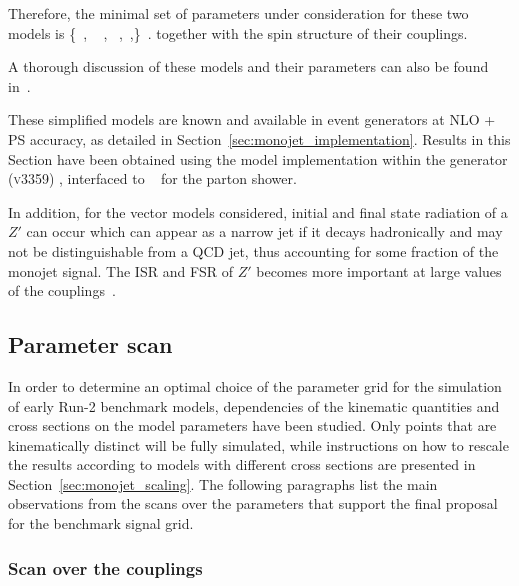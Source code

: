 Therefore, the minimal set of parameters under consideration for these two models is
\bea
\left\{~\gq, ~ \gDM, ~\mDM,~\mMed,\right\} \,.
\eea
together with the spin structure of their couplings. 

A thorough discussion of these models and their parameters can also be found in~\cite{Buchmueller:2014yoa}.
 

These simplified models are known and available in event generators at NLO + PS accuracy, as detailed in Section~\ref{sec:monojet_implementation}. 
Results in this Section have been obtained using the model implementation within the \powheg generator (\textsc{v3359}) \cite{Haisch:2013ata},  interfaced to \pythiaEight~\cite{Sjostrand:2007gs} for the parton shower.

In addition, for the vector models considered, initial and final state radiation of a $Z'$ can occur which can appear as a narrow jet if it decays hadronically and may not be distinguishable from a QCD jet, thus accounting for some fraction of the monojet signal. The ISR and FSR of $Z'$ becomes more important at large values of the couplings~\cite{Bai:2015nfa}. 

\subsection{Parameter scan}
\label{sub:parameter_scan_monojet}

In order to determine an optimal choice of the parameter grid for the simulation of early Run-2 benchmark models, dependencies of the kinematic quantities and cross sections on the model parameters have been studied. Only points that are kinematically distinct will be fully simulated, while instructions on how to rescale the results according to models with different cross sections are presented in Section~\ref{sec:monojet_scaling}. The following paragraphs list the main observations from the scans over the parameters that support the final proposal for the benchmark signal grid.

\subsubsection{Scan over the couplings}

